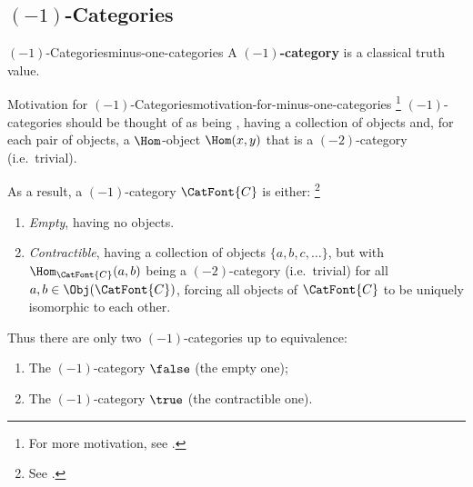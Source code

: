 \subsection{\texorpdfstring{$(-1)$}{(-1)}-Categories}\label{subsection-minus-one-categories}
\begin{definition}{$(-1)$-Categories}{minus-one-categories}%
    A \textbf{$(-1)$-category} is a classical truth value.%
\end{definition}
\begin{remark}{Motivation for $(-1)$-Categories}{motivation-for-minus-one-categories}%
    \footnote{%
        For more motivation, see \cite[p.~13]{lectures-on-n-categories-and-cohomology}.
    }%
    $(-1)$-categories should be thought of as being , having a collection of objects and, for each pair of objects, a $\Hom$-object $\Hom(x,y)$ that is a $(-2)$-category (i.e.\ trivial).%

    \indent As a result, a $(-1)$-category $\CatFont{C}$ is either:%
    \footnote{%
        See \cite[pp.~33--34]{lectures-on-n-categories-and-cohomology}.
        \par\vspace*{\TCBBoxCorrection}
    }%
    \begin{enumerate}
        \item\label{motivation-for-minus-one-categories-empty}\emph{Empty}, having no objects.
        \item\label{motivation-for-minus-one-categories-contractible}\emph{Contractible}, having a collection of objects $\{a,b,c,\ldots\}$, but with $\Hom_{\CatFont{C}}(a,b)$ being a $(-2)$-category (i.e.\ trivial) for all $a,b\in\Obj(\CatFont{C})$, forcing all objects of $\CatFont{C}$ to be uniquely isomorphic to each other.
    \end{enumerate}
    Thus there are only two $(-1)$-categories up to equivalence:
    \begin{enumerate}
        \item\label{motivation-for-minus-one-categories-false}The $(-1)$-category $\false$ (the empty one);
        \item\label{motivation-for-minus-one-categories-true}The $(-1)$-category $\true$  (the contractible one).%
    \end{enumerate}
\end{remark}
